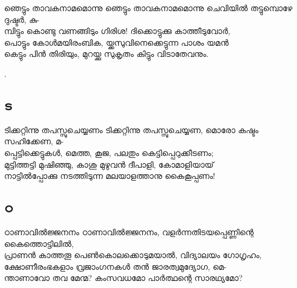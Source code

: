 \begin{enumerate}



\begin{slokam}{\VSv}{\KJ}{ഞെട്ടും താവകനാമമൊന്നു}
ഞെട്ടും താവകനാമമൊന്നു ചെവിയിൽ തട്ടുമ്പൊഴേ ദുഷ്ടർ, കു-\\
മ്പിട്ടും കൊണ്ടു വണങ്ങിടും ഗിരിശ! ദിക്കൊട്ടുക്കു കാത്തീടുവോർ, \\
പൊട്ടും കോൾമയിരംബിക, യ്ക്കസുവിനെക്കെട്ടുന്ന പാശം യമൻ \\
കെട്ടും പിൻ തിരിയും, മുറയ്ക്കു സുകൃതം കിട്ടും വിടാതേവനും. 
\end{slokam}


. 

\end{enumerate}

\subsection{ട}
\begin{enumerate}

\begin{slokam}{\VSv}{\EP}{ടിക്കറ്റിന്നു തപസ്സുചെയ്യണം}
ടിക്കറ്റിന്നു തപസ്സുചെയ്യണ, മൊരോ കഷ്ടം സഹിക്കേണ, മ-\\
പ്പെട്ടിക്കെട്ടുകള്‍, മെത്ത, കൂജ, പലതും കെട്ടിപ്പെറുക്കീടണം;\\
മുട്ടിത്തട്ടി മുഷിഞ്ഞു, കാശു മുഴുവൻ ദീപാളി, കോമാളിയായ്‌\\
നാട്ടിൽപ്പോക്കു നടത്തിടുന്ന മലയാളത്താനു കൈകൂപ്പണം!
\end{slokam}



\end{enumerate}

\subsection{ഠ}
\begin{enumerate}

\begin{slokam}{\VSv}{\VKG}{ഠാണാവിൽജ്ജനനം}
ഠാണാവിൽജ്ജനനം, വളർന്നതിടയപ്പെണ്ണിന്റെ കൈത്തൊട്ടിലിൽ,\\
പ്രാണൻ കാത്തതൂ പെൺകൊലക്കൊടുമയാൽ, വിദ്യാലയം ഗോഗൃഹം, \\
ക്ഷോണീരംഭകളാം വ്രജാംഗനകൾ തൻ ജാരത്വമുദ്യോഗ, മെ- \\
ന്താണാവോ തവ മേന്മ?  കംസവധമോ പാർത്ഥന്റെ സാരഥ്യമോ?
\end{slokam}



\end{enumerate}

